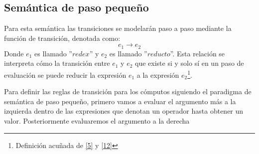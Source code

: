     \subsection{Semántica de paso pequeño}
        Para esta semántica las transiciones se modelarán paso a paso mediante la función de transición, denotada como: 
	$$e_1 \rightarrow e_2$$ 
	Donde $e_1$ es llamado ''$redex$'' y $e_2$ es llamado ''$reducto$''. Esta relación se interpreta cómo la transición entre $e_1$ y $e_2$ que existe si y solo sí en un paso de evaluación se puede reducir la expresión $e_1$ a la expresión $e_2$\footnote{Definición acuñada de \hyperlink{5}{[5]} y  \hyperlink{12}{[12]} }.

	Para definir las reglas de transición para los cómputos siguiendo el paradigma de semántica de paso pequeño, primero vamos a evaluar el argumento más a la izquierda dentro de las expresiones que denotan un operador hasta obtener un valor. Posteriormente evaluaremos el argumento a la derecha


